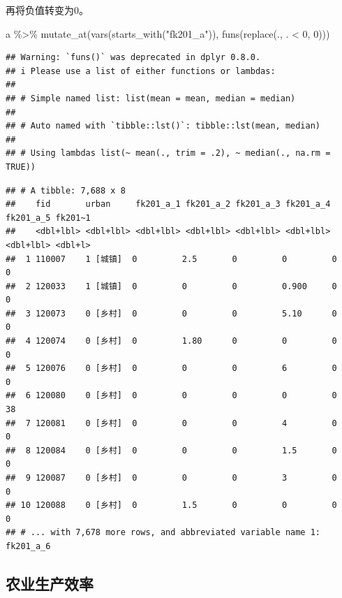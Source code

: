 \documentclass[
  oneside]{book}
\newenvironment{Shaded}{\begin{snugshade}}{\end{snugshade}}
\newcommand{\DecValTok}[1]{\textcolor[rgb]{0.00,0.00,0.81}{#1}}
\newcommand{\FunctionTok}[1]{\textcolor[rgb]{0.00,0.00,0.00}{#1}}
\newcommand{\NormalTok}[1]{#1}
\newcommand{\SpecialCharTok}[1]{\textcolor[rgb]{0.00,0.00,0.00}{#1}}
\newcommand{\StringTok}[1]{\textcolor[rgb]{0.31,0.60,0.02}{#1}}
\begin{document}
再将负值转变为0。

\begin{Shaded}
\begin{Highlighting}[]
\NormalTok{a }\SpecialCharTok{\%\textgreater{}\%} \FunctionTok{mutate\_at}\NormalTok{(}\FunctionTok{vars}\NormalTok{(}\FunctionTok{starts\_with}\NormalTok{(}\StringTok{"fk201\_a"}\NormalTok{)), }\FunctionTok{funs}\NormalTok{(}\FunctionTok{replace}\NormalTok{(., . }\SpecialCharTok{\textless{}} \DecValTok{0}\NormalTok{, }\DecValTok{0}\NormalTok{)))}
\end{Highlighting}
\end{Shaded}

\begin{verbatim}
## Warning: `funs()` was deprecated in dplyr 0.8.0.
## i Please use a list of either functions or lambdas:
## 
## # Simple named list: list(mean = mean, median = median)
## 
## # Auto named with `tibble::lst()`: tibble::lst(mean, median)
## 
## # Using lambdas list(~ mean(., trim = .2), ~ median(., na.rm = TRUE))
\end{verbatim}

\begin{verbatim}
## # A tibble: 7,688 x 8
##    fid       urban     fk201_a_1 fk201_a_2 fk201_a_3 fk201_a_4 fk201_a_5 fk201~1
##    <dbl+lbl> <dbl+lbl> <dbl+lbl> <dbl+lbl> <dbl+lbl> <dbl+lbl> <dbl+lbl> <dbl+l>
##  1 110007    1 [城镇]  0         2.5       0         0         0          0     
##  2 120033    1 [城镇]  0         0         0         0.900     0          0     
##  3 120073    0 [乡村]  0         0         0         5.10      0          0     
##  4 120074    0 [乡村]  0         1.80      0         0         0          0     
##  5 120076    0 [乡村]  0         0         0         6         0          0     
##  6 120080    0 [乡村]  0         0         0         0         0         38     
##  7 120081    0 [乡村]  0         0         0         4         0          0     
##  8 120084    0 [乡村]  0         0         0         1.5       0          0     
##  9 120087    0 [乡村]  0         0         0         3         0          0     
## 10 120088    0 [乡村]  0         1.5       0         0         0          0     
## # ... with 7,678 more rows, and abbreviated variable name 1: fk201_a_6
\end{verbatim}

\hypertarget{ux519cux4e1aux751fux4ea7ux6548ux7387}{%
\subsection{农业生产效率}\label{ux519cux4e1aux751fux4ea7ux6548ux7387}}
\end{document}

